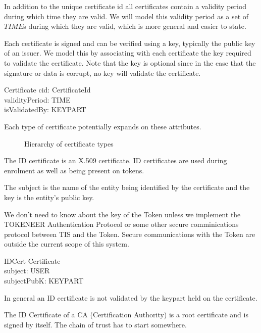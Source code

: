 In addition to the unique certificate id all certificates contain a
validity period during which time they are valid. We will model this
validity period as a set of $TIME$s during which they are valid,
which is more general and easier to state. 

Each certificate is signed and can be verified using a key, typically the
public key of an issuer. We model this by associating with each
certificate the key required to validate the certificate. Note that
the key is optional since in the case that the signature or data is
corrupt, no key will validate the certificate.

\begin{schema}{Certificate}
        cid: CertificateId
\\	validityPeriod: \power TIME
\\      isValidatedBy: \Optional KEYPART
\end{schema}

Each type of certificate potentially expands on these attributes.

\begin{figure}[htbp]
  \begin{center}
    \leavevmode
    \caption{Hierarchy of certificate types}
    \label{fig:certificates}
  \end{center}
\end{figure}

The ID certificate is an X.509 certificate. ID certificates are used
during enrolment as well as being present on tokens.

The subject is the name of the entity being identified by the
certificate and the key is the entity's public key. 

We don't need to know about the key of the Token unless we implement 
the TOKENEER Authentication Protocol or some other secure
comminications protocol between TIS and the Token. Secure
communications with the Token are outside the current scope of this system.

\begin{schema}{IDCert}
	Certificate
\\      subject: USER
\\      subjectPubK: KEYPART
\end{schema}

In general an ID certificate is not validated by the keypart held on
the certificate. 

The ID Certificate of a CA (Certification Authority) is a root
certificate and is signed by itself. The chain of trust has
to start somewhere.


